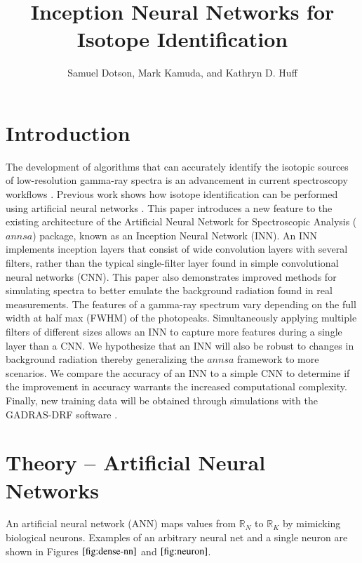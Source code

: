 \documentclass[fleqn]{anstrans}
\title{Inception Neural Networks for Isotope Identification}
\author{Samuel Dotson, Mark Kamuda, and Kathryn D. Huff}
\institute{
Dept. of Nuclear, Plasma and Radiological Engineering, University of Illinois at Urbana-Champaign \\
sgd2@illinois.edu
}
\begin{document}

\section{Introduction}
The development of algorithms that can accurately identify the isotopic sources of low-resolution gamma-ray 
spectra is an advancement in current spectroscopy workflows \cite{rawool-sullivanStepsAutomatedGamma2010}.
Previous work shows how isotope identification can be performed using 
artificial neural networks 
\cite{kamudaAutomatedIsotopeIdentification2017,kamudaComparisonMachineLearning2018a,kamudaMachineLearningApproach2018}. 
This paper introduces a new feature to the existing architecture of the Artificial Neural Network for Spectroscopic Analysis ($\textit{annsa}$) package, known as an Inception Neural Network (INN). 
An INN implements inception layers that consist of wide convolution layers with several filters, rather than the typical single-filter layer found in simple convolutional neural networks (CNN).
This paper also demonstrates improved methods for simulating spectra to better emulate the background radiation found in real measurements. 
The features of a gamma-ray spectrum vary depending on the full width at half max (FWHM) of the photopeaks. 
Simultaneously applying multiple filters of different sizes allows an INN to capture more features during a single layer than a CNN. 
We hypothesize that an INN will also be robust to changes in background radiation thereby generalizing the $\textit{annsa}$ framework to more scenarios. 
We compare the accuracy of an INN to a simple CNN to determine if the improvement in accuracy warrants the increased computational complexity. 
Finally, new training data will be obtained through simulations with the GADRAS-DRF software \cite{mitchellGADRASIsotopeID2014}.

\section{Theory -- Artificial Neural Networks}

An artificial neural network (ANN) maps values from ${\mathbb{R}}_{N}$ to ${\mathbb{R}}_{K}$ by mimicking biological 
neurons. Examples of an arbitrary neural net and a single neuron are shown in Figures $\ref{fig:dense-nn}$ and $\ref{fig:neuron}$. 
\end{document}

